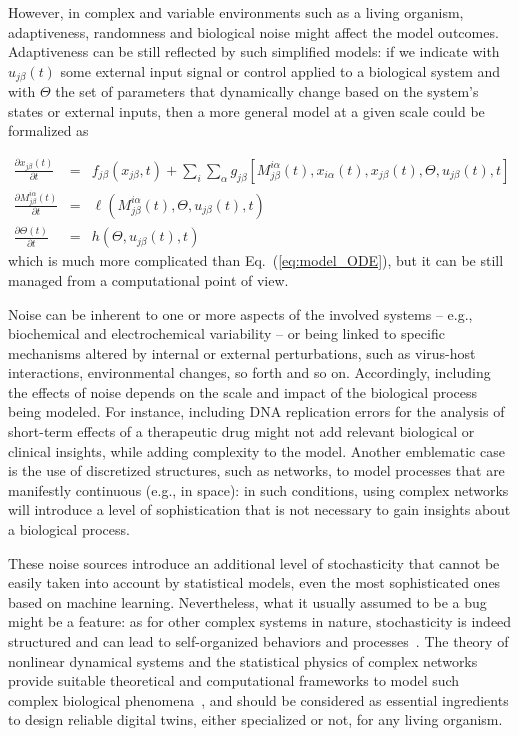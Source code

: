 \documentclass[12pt]{article}
\renewcommand{\(}{\left(}
\renewcommand{\)}{\right)}
\renewcommand{\[}{\left[}
\renewcommand{\]}{\right]}
\begin{document}
However, in complex and variable environments such as a living organism, adaptiveness, randomness and biological noise might affect the model outcomes. Adaptiveness can be still reflected by such simplified models: if we indicate with $u_{j\beta}(t)$ some external input signal or control applied to a biological system and with $\Theta$ the set of parameters that dynamically change based on the system's states or external inputs, then a more general model at a given scale could be formalized as

\begin{eqnarray}
\label{eq:model_ODE2}
\frac{\partial x_{j\beta}(t)}{\partial t} &=& f_{j\beta}(x_{j\beta},t) + \sum_{i}\sum_{\alpha} g_{j\beta}\left[M^{i\alpha}_{j\beta}(t), x_{i\alpha}(t), x_{j\beta}(t), \Theta, u_{j\beta}(t), t\right]\nonumber\\
\frac{\partial M^{i\alpha}_{j\beta}(t)}{\partial t} &=& \ell(M^{i\alpha}_{j\beta}(t), \Theta, u_{j\beta}(t), t)\nonumber\\
\frac{\partial \Theta(t)}{\partial t} &=& h(\Theta, u_{j\beta}(t), t)
\end{eqnarray}
which is much more complicated than Eq.~(\ref{eq:model_ODE}), but it can be still managed from a computational point of view. 

Noise can be inherent to one or more aspects of the involved systems -- e.g., biochemical and electrochemical variability -- or being linked to specific mechanisms altered by internal or external perturbations, such as virus-host interactions, environmental changes, so forth and so on. Accordingly, including the effects of noise depends on the scale and impact of the biological process being modeled. For instance, including DNA replication errors for the analysis of short-term effects of a therapeutic drug might not add relevant biological or clinical insights, while adding complexity to the model. Another emblematic case is the use of discretized structures, such as networks, to model processes that are manifestly continuous (e.g., in space): in such conditions, using complex networks will introduce a level of sophistication that is not necessary to gain insights about a biological process.

These noise sources introduce an additional level of stochasticity that cannot be easily taken into account by statistical models, even the most sophisticated ones based on machine learning. Nevertheless, what it usually assumed to be a bug might be a feature: as for other complex systems in nature, stochasticity is indeed structured and can lead to self-organized behaviors and processes~\cite{nicolis1977self,heylighen2001science,camazine2020self}. The theory of nonlinear dynamical systems and the statistical physics of complex networks provide suitable theoretical and computational frameworks to model such complex biological phenomena~\cite{fang2019nonequilibrium}, and should be considered as essential ingredients to design reliable digital twins, either specialized or not, for any living organism.
\end{document}
